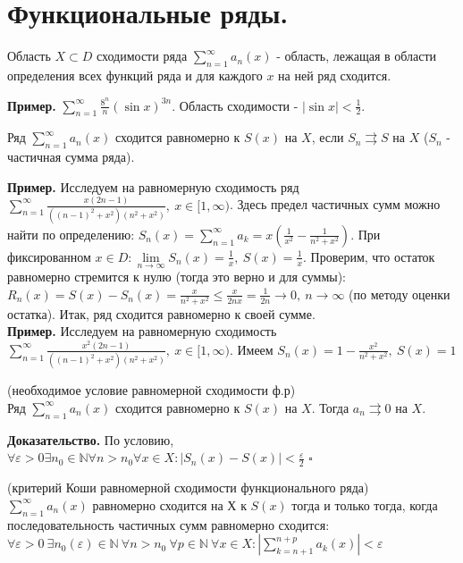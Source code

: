 \section{Функциональные ряды.}
\begin{defin}
Область $X\subset D$ сходимости  ряда $\sum\limits_{n=1}^{\infty} a_n(x)$ -
область, лежащая в области определения всех функций ряда и для каждого
$x$ на ней ряд сходится.
\end{defin}
\textbf{Пример.} $\sum\limits_{n=1}^{\infty} \frac{8^n}{n}(\sin x)^{3n}$.
Область сходимости - $|\sin x|<\frac{1}{2}$.
\begin{defin}
Ряд $\sum\limits_{n=1}^{\infty} a_n(x)$ сходится равномерно к $S(x)$ на  $X$,
если  $S_n\rightrightarrows S$ на  $X$ ($S_n$ - частичная сумма ряда).
\end{defin}
\textbf{Пример.} Исследуем на равномерную сходимость ряд $\sum\limits_{n=1}
^{\infty} \frac{x(2n-1)}{((n-1)^2+x^2)(n^2+x^2)},~x\in[1,\infty)$. Здесь
предел частичных сумм можно найти по определению: $S_n(x)=\sum\limits_{n=1}
^{\infty} a_k=x(\frac{1}{x^2}-\frac{1}{n^2+x^2})$. При фиксированном
$x\in D: \lim\limits_{n \to \infty} S_n(x)=\frac{1}{x},~S(x)=\frac{1}{x}$.
Проверим, что остаток равномерно стремится к нулю (тогда это верно 
и для суммы): $R_n(x)=S(x)-S_n(x)=\frac{x}{n^2+x^2}\leqslant \frac{x}{2nx}=
\frac{1}{2n}\to0,~n\to\infty$ (по методу оценки остатка). Итак, ряд сходится
равномерно к своей сумме.\\
\textbf{Пример.} Исследуем на равномерную сходимость $\sum\limits_{n=1}
^{\infty} \frac{x^2(2n-1)}{((n-1)^2+x^2)(n^2+x^2)},~x\in[1,\infty)$. Имеем 
$S_n(x)=1-\frac{x^2}{n^2+x^2},~S(x)=1$ 
\begin{theor}
    (необходимое условие равномерной сходимости ф.р)\\
    Ряд $\sum\limits_{n=1}^{\infty} a_n(x)$ сходится равномерно к $S(x)$ на
     $X$. Тогда  $a_n\rightrightarrows0$ на $X$. 
\end{theor}
\textbf{Доказательство.}  По условию, $\forall \varepsilon>0\exists n_0\in
\mathbb{N}\forall n>n_0\forall x\in X: |S_n(x)-S(x)|<\frac{\varepsilon}{2}$
$\square$ 
\begin{theor}
    (критерий Коши равномерной сходимости функционального ряда)\\
    $\sum\limits_{n=1}^{\infty} a_n(x)$ равномерно сходится на Х к $S(x)$
    тогда и только тогда, когда последовательность частичных сумм равномерно
    сходится:  $\forall \varepsilon>0~\exists n_0(\varepsilon)\in\mathbb{N}
    ~\forall n>n_0~\forall p\in\mathbb{N}~\forall x\in X:|\sum\limits_{k=n+1}
    ^{n+p}a_k(x)|<\varepsilon$
\end{theor}
